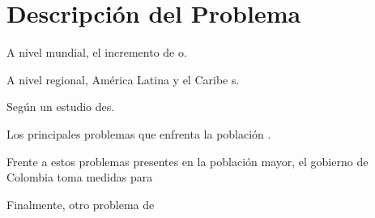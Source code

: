 \newpage
\section{Descripción del Problema}

A nivel mundial, el incremento de o.\hfill \break

A nivel regional, América Latina y el Caribe s.\hfill \break

Según un estudio des.\hfill \break

Los principales problemas que enfrenta la población .\hfill \break

Frente a estos problemas presentes en la población mayor, el gobierno de Colombia toma medidas para 


Finalmente, otro problema de \hfill \break

